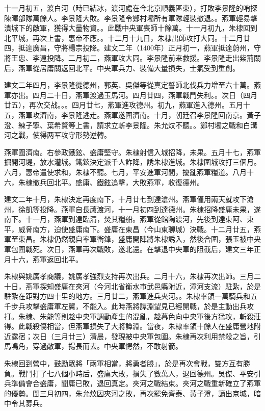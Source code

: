 十一月初五，渡白河（時已結冰，渡河處在今北京順義區東），打敗李景隆的哨探陳暉部隊萬餘人。李景隆大敗。李景隆令鄭村壩所有軍隊輕裝撤退。。燕軍輕易擊潰城下的敵軍，獲得大量物資。。此戰中央軍喪師十餘萬。十一月初九，朱棣回到北平城，再次上書，惠帝不應。。十二月十九日，朱棣出師攻打大同。十二月廿四，抵達廣昌，守將楊宗投降。建文二年（1400年）正月初一，燕軍抵達蔚州，守將王忠、李遠投降。二月初二，燕軍攻大同。李景隆前来救援。李景隆走出紫荊關后，燕軍從居庸關返回北平。中央軍兵力、裝備大量損失，士氣受到重創。

建文二年四月，李景隆從德州，郭英、吳傑等從真定誓師北伐兵力增至六十萬。燕軍亦出。四月二十日，燕軍渡過玉馬河。四月廿四，燕軍戰鬥失利。。次日（四月廿五），再次交战。。。四月廿七，燕軍進攻德州。初九，燕軍進入德州。五月十五，燕軍攻濟南，李景隆逃走。燕軍遂圍濟南。十月，朝廷召李景隆回南京。黃子澄、練子寧、葉希賢等上書，請求立斬李景隆。朱允炆不聽。。鄭村壩之戰和白溝河之戰，使得两军攻守形勢逆轉。

燕軍圍濟南。右參政鐵鉉、盛庸堅守。朱棣射信入城招降，未果。五月十七，燕軍掘開河堤，放水灌城。鐵鉉決定派千人詐降，誘朱棣進城。朱棣圍城攻打三個月。六月，惠帝遣使求和，朱棣不聽。七月，平安進軍河間，擾亂燕軍糧道。八月十六，朱棣撤兵回北平。盛庸、鐵鉉追擊，大敗燕軍，收復德州。

建文二年十月，朱棣決定再度南下，十月廿七到達滄州。燕軍僅用兩天就攻下滄州，徐凱等投降。燕軍自長蘆渡河，十一月初四到達德州。朱棣招降盛庸未果，遂南下。十一月，燕軍到達臨清，焚其糧船。燕軍從館陶渡河，先後到達東阿、東平，威脅南方，迫使盛庸南下。盛庸在東昌（今山東聊城）決戰。十二月廿五，燕軍至東昌。朱棣仍然親自率軍衝鋒，盛庸開陣將朱棣誘入，然後合圍，張玉被中央軍包圍戰死。次日，燕軍再次戰敗，遂北還。在擊退中央軍的阻截后，建文三年正月十六，燕軍返回北平。

朱棣與姚廣孝商議，姚廣孝強烈支持再次出兵。二月十六，朱棣再次出師。三月二十日，燕軍探知盛庸在夾河（今河北省衡水市武邑縣附近，漳河支流）駐紮，於是駐紮在距對方四十里的地方。三月廿二，燕軍進兵夾河。。朱棣率領一萬騎兵和五千步兵攻擊盛庸軍左翼，不能入。此時燕將譚淵望見已經開戰，於是主動出兵攻打。朱棣、朱能等則趁中央軍調動產生的混亂，趁暮色向中央軍後方猛攻，斬殺莊得。此戰殺傷相當，但燕軍損失了大將譚淵。當夜，朱棣率領十餘人在盛庸營地附近露宿；次日（三月廿三）清晨，發現被中央軍包圍。朱棣再次利用禁殺之旨，引馬鳴角，穿過敵軍，揚長而去。中央軍愕然，不敢射箭。

朱棣回到營中，鼓勵眾將「兩軍相當，將勇者勝」，於是再次會戰，雙方互有勝負。戰鬥打了七八個小時后，盛庸大敗，損失了數萬人，退回德州。吳傑、平安引兵準備會合盛庸，聞庸已敗，退回真定。夾河之戰結束。夾河之戰重新確立了燕軍的優勢。閏三月初四，朱允炆因夾河之敗，再次罷免齊泰、黃子澄，謫出京城，暗中令其募兵。

